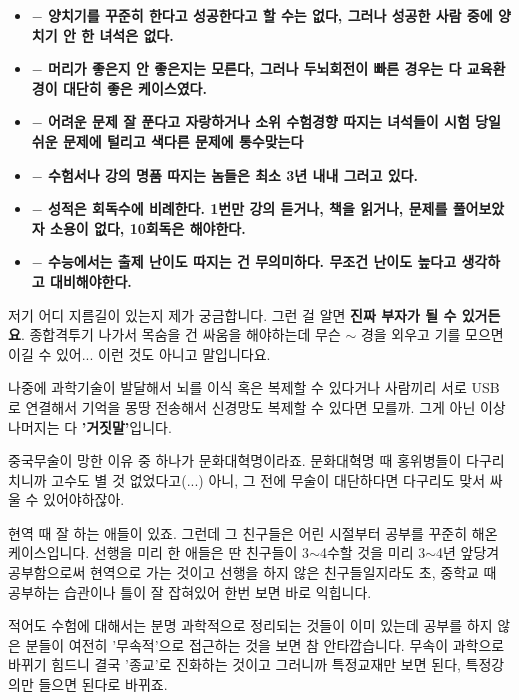 \begin{itemize}
    \item \textbf{$-$ 양치기를 꾸준히 한다고 성공한다고 할 수는 없다, 그러나 성공한 사람 중에 양치기 안 한 녀석은 없다.}
    \item \textbf{$-$ 머리가 좋은지 안 좋은지는 모른다, 그러나 두뇌회전이 빠른 경우는 다 교육환경이 대단히 좋은 케이스였다.}
    \item \textbf{$-$ 어려운 문제 잘 푼다고 자랑하거나 소위 수험경향 따지는 녀석들이 시험 당일 쉬운 문제에 털리고 색다른 문제에 통수맞는다}
    \item \textbf{$-$ 수험서나 강의 명품 따지는 놈들은 최소 3년 내내 그러고 있다.}
    \item \textbf{$-$ 성적은 회독수에 비례한다. 1번만 강의 듣거나, 책을 읽거나, 문제를 풀어보았자 소용이 없다, 10회독은 해야한다.}
    \item \textbf{$-$ 수능에서는 출제 난이도 따지는 건 무의미하다. 무조건 난이도 높다고 생각하고 대비해야한다.}
\end{itemize}
저기 어디 지름길이 있는지 제가 궁금합니다. 그런 걸 알면 \textbf{진짜 부자가 될 수 있거든요}.   종합격투기 나가서 목숨을 건 싸움을 해야하는데 무슨 $\sim$ 경을 외우고 기를 모으면 이길 수 있어...
이런 것도 아니고 말입니다요.
\vspace{5mm}

나중에 과학기술이 발달해서 뇌를 이식 혹은 복제할 수 있다거나
사람끼리 서로 USB로 연결해서 기억을 몽땅 전송해서 신경망도 복제할 수 있다면 모를까.
그게 아닌 이상 나머지는 다 \textbf{'거짓말'}입니다.
\vspace{5mm}

중국무술이 망한 이유 중 하나가 문화대혁명이라죠.
문화대혁명 때 홍위병들이 다구리치니까 고수도 별 것 없었다고(...)
아니, 그 전에 무술이 대단하다면 다구리도 맞서 싸울 수 있어야하잖아.
\vspace{5mm}

현역 때 잘 하는 애들이 있죠. 그런데 그 친구들은 어린 시절부터 공부를 꾸준히 해온 케이스입니다.
선행을 미리 한 애들은 딴 친구들이 3$\sim$4수할 것을 미리 3$\sim$4년 앞당겨 공부함으로써 현역으로 가는 것이고
선행을 하지 않은 친구들일지라도 초, 중학교 때 공부하는 습관이나 틀이 잘 잡혀있어 한번 보면 바로 익힙니다.
\vspace{5mm}

적어도 수험에 대해서는 분명 과학적으로 정리되는 것들이 이미 있는데
공부를 하지 않은 분들이 여전히 '무속적'으로 접근하는 것을 보면 참 안타깝습니다.
무속이 과학으로 바뀌기 힘드니 결국 '종교'로 진화하는 것이고 그러니까 특정교재만 보면 된다, 특정강의만 들으면 된다로 바뀌죠.
\vspace{5mm}


